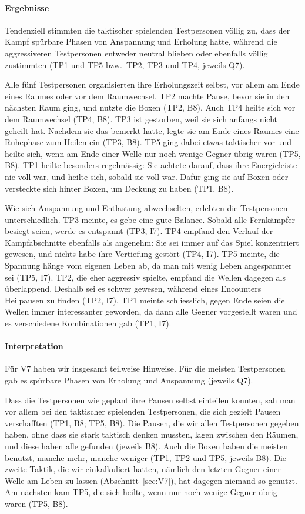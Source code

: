 \documentclass[../Main.tex]{subfiles}
\begin{document}
\paragraph{Ergebnisse}
Tendenziell stimmten die taktischer spielenden Testpersonen völlig zu, dass der Kampf spürbare Phasen von Anspannung und Erholung hatte, während die aggressiveren Testpersonen entweder neutral blieben oder ebenfalls völlig zustimmten (TP1 und TP5 bzw.\ TP2, TP3 und TP4, jeweils Q7).

Alle fünf Testpersonen organisierten ihre Erholungszeit selbst, vor allem am Ende eines Raumes oder vor dem Raumwechsel. TP2 machte Pause, bevor sie in den nächsten Raum ging, und nutzte die Boxen (TP2, B8). Auch TP4 heilte sich vor dem Raumwechsel (TP4, B8). TP3 ist gestorben, weil sie sich anfangs nicht geheilt hat. Nachdem sie das bemerkt hatte, legte sie am Ende eines Raumes eine Ruhephase zum Heilen ein (TP3, B8). TP5 ging dabei etwas taktischer vor und heilte sich, wenn am Ende einer Welle nur noch wenige Gegner übrig waren (TP5, B8). TP1 heilte besonders regelmässig: Sie achtete darauf, dass ihre Energieleiste nie voll war, und heilte sich, sobald sie voll war. Dafür ging sie auf Boxen oder versteckte sich hinter Boxen, um Deckung zu haben (TP1, B8).

Wie sich Anspannung und Entlastung abwechselten, erlebten die Testpersonen unterschiedlich. TP3 meinte, es gebe eine gute Balance. Sobald alle Fernkämpfer besiegt seien, werde es entspannt (TP3, I7). TP4 empfand den Verlauf der Kampfabschnitte ebenfalls als angenehm: Sie sei immer auf das Spiel konzentriert gewesen, und nichts habe ihre Vertiefung gestört (TP4, I7). TP5 meinte, die Spannung hänge vom eigenen Leben ab, da man mit wenig Leben angespannter sei (TP5, I7). TP2, die eher aggressiv spielte, empfand die Wellen dagegen als überlappend. Deshalb sei es schwer gewesen, während eines Encounters Heilpausen zu finden (TP2, I7). TP1 meinte schliesslich, gegen Ende seien die Wellen immer interessanter geworden, da dann alle Gegner vorgestellt waren und es verschiedene Kombinationen gab (TP1, I7).

\paragraph{Interpretation}
Für V7 haben wir insgesamt teilweise Hinweise. Für die meisten Testpersonen gab es spürbare Phasen von Erholung und Anspannung (jeweils Q7).

Dass die Testpersonen wie geplant ihre Pausen selbst einteilen konnten, sah man vor allem bei den taktischer spielenden Testpersonen, die sich gezielt Pausen verschafften (TP1, B8; TP5, B8). Die Pausen, die wir allen Testpersonen gegeben haben, ohne dass sie stark taktisch denken mussten, lagen zwischen den Räumen, und diese haben alle gefunden (jeweils B8). Auch die Boxen haben die meisten benutzt, manche mehr, manche weniger (TP1, TP2 und TP5, jeweils B8). Die zweite Taktik, die wir einkalkuliert hatten, nämlich den letzten Gegner einer Welle am Leben zu lassen (Abschnitt~\ref{sec:V7}), hat dagegen niemand so genutzt. Am nächsten kam TP5, die sich heilte, wenn nur noch wenige Gegner übrig waren (TP5, B8).
\end{document}
